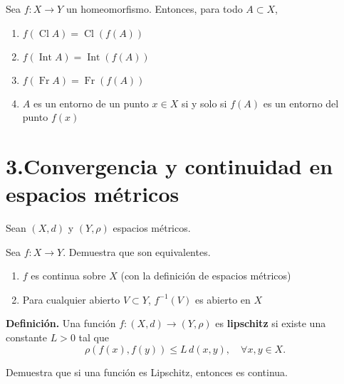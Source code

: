 \documentclass[b5paper,10pt,twoside]{book}
\begin{document}
\begin{problem}
 Sea \( f : X \to Y \) un homeomorfismo. Entonces, para todo \( A \subset X \),
\begin{enumerate}[label=(\roman*)]
    \item \( f(\operatorname{Cl} A) = \operatorname{Cl}(f(A)) \)
    \item \( f(\operatorname{Int} A) = \operatorname{Int}(f(A)) \)
    \item \( f(\operatorname{Fr} A) = \operatorname{Fr}(f(A)) \)
    \item \( A \) es un entorno de un punto \( x \in X \) si y solo si \( f(A) \) es un entorno del punto \( f(x) \)
\end{enumerate}
\end{problem}

\section*{3.\enspace Convergencia y continuidad en espacios métricos}

Sean \(  (X, d) \) y \( (Y, \rho) \)
espacios métricos.

\begin{problem}
Sea \( f : X \to Y \).
Demuestra que son equivalentes.
\begin{enumerate}[label=(\roman*)]
    \item \( f \) es continua sobre \( X \) (con la definición de espacios métricos)
    \item Para cualquier abierto \( V \subset Y \), \( f^{-1}(V) \) es abierto en \( X \)
\end{enumerate}

\end{problem}

\noindent
\textbf{Definición.}
Una función \( f : (X, d) \to (Y, \rho) \) es \textbf{lipschitz} si existe una constante \( L > 0 \) tal que 
\[
\rho(f(x), f(y)) \leq L \, d(x, y), \quad \forall x, y \in X.
\]

\begin{problem}
Demuestra que si una función es Lipschitz, entonces es continua.
\end{problem}
\end{document}
